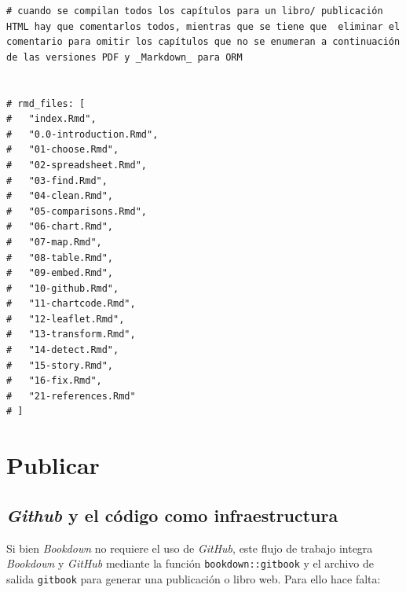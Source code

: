\documentclass[
]{krantz}
\begin{document}
\begin{verbatim}
# cuando se compilan todos los capítulos para un libro/ publicación HTML hay que comentarlos todos, mientras que se tiene que  eliminar el comentario para omitir los capítulos que no se enumeran a continuación de las versiones PDF y _Markdown_ para ORM


# rmd_files: [
#   "index.Rmd",
#   "0.0-introduction.Rmd",
#   "01-choose.Rmd",
#   "02-spreadsheet.Rmd",
#   "03-find.Rmd",
#   "04-clean.Rmd",
#   "05-comparisons.Rmd",
#   "06-chart.Rmd",
#   "07-map.Rmd",
#   "08-table.Rmd",
#   "09-embed.Rmd",
#   "10-github.Rmd",
#   "11-chartcode.Rmd",
#   "12-leaflet.Rmd",
#   "13-transform.Rmd",
#   "14-detect.Rmd",
#   "15-story.Rmd",
#   "16-fix.Rmd",
#   "21-references.Rmd"
# ]
\end{verbatim}

\hypertarget{publicar}{%
\chapter{Publicar}\label{publicar}}

\hypertarget{github-y-el-cuxf3digo-como-infraestructura}{%
\section{\texorpdfstring{\emph{Github} y el código como infraestructura}{Github y el código como infraestructura}}\label{github-y-el-cuxf3digo-como-infraestructura}}

Si bien \emph{Bookdown} no requiere el uso de \emph{GitHub}, este flujo de trabajo integra \emph{Bookdown} y \emph{GitHub} mediante la función \texttt{bookdown::gitbook} y el archivo de salida \texttt{gitbook} para generar una publicación o libro web. Para ello hace falta:
\end{document}
